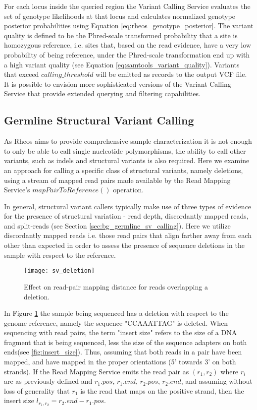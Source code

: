 For each locus inside the queried region the Variant Calling Service evaluates the set of genotype likelihoods at that locus and calculates normalized genotype posterior probabilities using Equation \ref{eq:rheos_genotype_posterior}. The variant quality is defined to be the Phred-scale transformed probability that a site is homozygous reference, i.e. sites that, based on the read evidence, have a very low probability of being reference, under the Phred-scale transformation end up with a high variant quality (see Equation \ref{eq:samtools_variant_quality}). Variants that exceed $calling\_threshold$ will be emitted as records to the output VCF file. It is possible to envision more sophisticated versions of the Variant Calling Service that provide extended querying and filtering capabilities.

\subsection{Germline Structural Variant Calling}

As Rheos aims to provide comprehensive sample characterization it is not enough to only be able to call single nucleotide polymorphisms, the ability to call other variants, such as indels and structural variants is also required. Here we examine an approach for calling a specific class of structural variants, namely deletions, using a stream of mapped read pairs made available by the Read Mapping Service's $mapPairToReference()$ operation. 

In general, structural variant callers typically make use of three types of evidence for the presence of structural variation - read depth, discordantly mapped reads, and split-reads (see Section \ref{sec:bg_germline_sv_calling}). Here we utilize discordantly mapped reads i.e. those read pairs that align farther away from each other than expected in order to assess the presence of sequence deletions in the sample with respect to the reference.

\begin{figure}[H]
    \texttt{[image: sv\_deletion]}
    \centering
    \caption {Effect on read-pair mapping distance for reads overlapping a deletion.}
    \label{fig:sv_deletion}
\end{figure}

In Figure \ref{fig:sv_deletion} the sample being sequenced has a deletion with respect to the genome reference, namely the sequence "CCAAATTAG" is deleted. When sequencing with read pairs, the term "insert size" refers to the size of a DNA fragment that is being sequenced, less the size of the sequence adapters on both ends(see \ref{fig:insert_size}). Thus, assuming that both reads in a pair have been mapped, and have mapped in the proper orientations (5' towards 3' on both strands). If the Read Mapping Service emits the read pair as $(r_1, r_2)$ where $r_i$ are as previously defined and $r_1.pos$, $r_1.end$, $r_2.pos$, $r_2.end$, and assuming without loss of generality that $r_1$ is the read that maps on the positive strand, then the insert size $l_{r_1,r_2} = r_2.end - r_1.pos$.    

